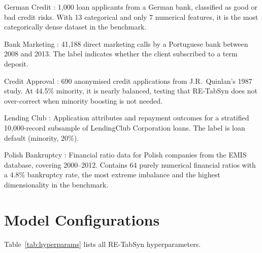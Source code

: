 German Credit \cite{uci_german}: 1,000 loan applicants from a German bank, classified as good or bad credit risks. With 13 categorical and only 7 numerical features, it is the most categorically dense dataset in the benchmark.

Bank Marketing \cite{uci_bankmarketing}: 41,188 direct marketing calls by a Portuguese bank between 2008 and 2013. The label indicates whether the client subscribed to a term deposit.

Credit Approval \cite{uci_creditapproval}: 690 anonymised credit applications from J.R.\ Quinlan's 1987 study. At 44.5\% minority, it is nearly balanced, testing that RE-TabSyn does not over-correct when minority boosting is not needed.

Lending Club \cite{kaggle_lendingclub}: Application attributes and repayment outcomes for a stratified 10,000-record subsample of LendingClub Corporation loans. The label is loan default (minority, 20\%).

Polish Bankruptcy \cite{uci_polishbankruptcy}: Financial ratio data for Polish companies from the EMIS database, covering 2000--2012. Contains 64 purely numerical financial ratios with a 4.8\% bankruptcy rate, the most extreme imbalance and the highest dimensionality in the benchmark.

\section{Model Configurations}

Table~\ref{tab:hyperparams} lists all RE-TabSyn hyperparameters.

\renewcommand{\arraystretch}{1.2}

